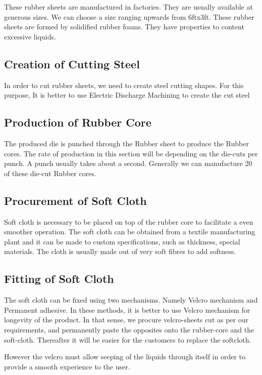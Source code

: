 \documentclass[12pt,a4paper,oneside]{article}
\begin{document}
These rubber sheets are manufactured in factories. They are usually available at generous sizes. We can choose a size ranging upwards from 6ftx3ft. These rubber sheets are formed by solidified rubber foams. They have properties to content excessive liquids. 

\subsection{Creation of Cutting Steel}

In order to cut rubber sheets, we need to create steel cutting shapes. For this purpose, It is better to use Electric Discharge Machining to create the cut steel

\subsection{Production of Rubber Core}

The produced die is punched through the Rubber sheet to produce the Rubber cores. The rate of production in this section will be depending on the die-cuts per punch. A punch usually takes about a second. Generally we can manufacture 20 of these die-cut Rubber cores. 

\subsection{Procurement of Soft Cloth}

Soft cloth is necessary to be placed on top of the rubber core to facilitate a even smoother operation. The soft cloth can be obtained from a textile manufacturing plant and it can be made to custom specifications, such as thickness, special materials. The cloth is usually made out of very soft fibres to add softness.


\subsection{Fitting of Soft Cloth}

The soft cloth can be fixed using two mechanisms. Namely Velcro mechanism and Permanent adhesive. In these methods, it is better to use Velcro mechanism for longevity of the product. In that sense, we procure velcro-sheets cut as per our requirements, and permanently paste the opposites onto the rubber-core and the soft-cloth. Thereafter it will be easier for the customers to replace the softcloth. 

However the velcro must allow seeping of the liquids through itself in order to provide a smooth experience to the user.
\end{document}
